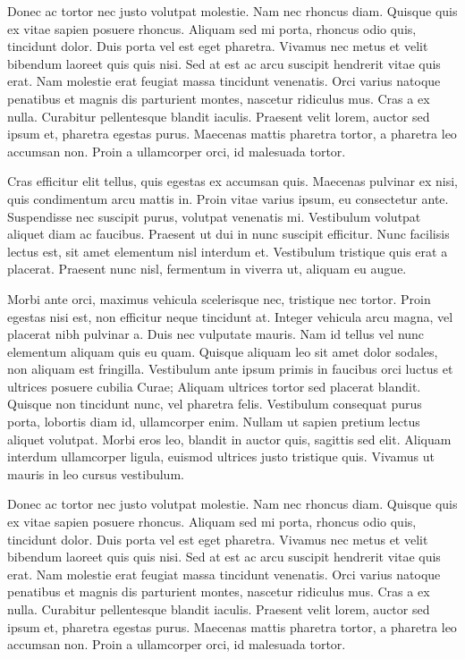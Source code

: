 \documentclass[OGEO,XML,SOM,NoBabelFrench,Unicode,twocolumn,review]{cedram}
\begin{document}
        Donec ac tortor nec justo volutpat molestie. Nam nec rhoncus diam. Quisque quis ex vitae sapien posuere rhoncus. Aliquam sed mi porta, rhoncus odio quis, tincidunt dolor. Duis porta vel est eget pharetra. Vivamus nec metus et velit bibendum laoreet quis quis nisi. Sed at est ac arcu suscipit hendrerit vitae quis erat. Nam molestie erat feugiat massa tincidunt venenatis. Orci varius natoque penatibus et magnis dis parturient montes, nascetur ridiculus mus. Cras a ex nulla. Curabitur pellentesque blandit iaculis. Praesent velit lorem, auctor sed ipsum et, pharetra egestas purus. Maecenas mattis pharetra tortor, a pharetra leo accumsan non. Proin a ullamcorper orci, id malesuada tortor.
        
        Cras efficitur elit tellus, quis egestas ex accumsan quis. Maecenas pulvinar ex nisi, quis condimentum arcu mattis in. Proin vitae varius ipsum, eu consectetur ante. Suspendisse nec suscipit purus, volutpat venenatis mi. Vestibulum volutpat aliquet diam ac faucibus. Praesent ut dui in nunc suscipit efficitur. Nunc facilisis lectus est, sit amet elementum nisl interdum et. Vestibulum tristique quis erat a placerat. Praesent nunc nisl, fermentum in viverra ut, aliquam eu augue.
    
        Morbi ante orci, maximus vehicula scelerisque nec, tristique nec tortor. Proin egestas nisi est, non efficitur neque tincidunt at. Integer vehicula arcu magna, vel placerat nibh pulvinar a. Duis nec vulputate mauris. Nam id tellus vel nunc elementum aliquam quis eu quam. Quisque aliquam leo sit amet dolor sodales, non aliquam est fringilla. Vestibulum ante ipsum primis in faucibus orci luctus et ultrices posuere cubilia Curae; Aliquam ultrices tortor sed placerat blandit. Quisque non tincidunt nunc, vel pharetra felis. Vestibulum consequat purus porta, lobortis diam id, ullamcorper enim. Nullam ut sapien pretium lectus aliquet volutpat. Morbi eros leo, blandit in auctor quis, sagittis sed elit. Aliquam interdum ullamcorper ligula, euismod ultrices justo tristique quis. Vivamus ut mauris in leo cursus vestibulum.
        
        Donec ac tortor nec justo volutpat molestie. Nam nec rhoncus diam. Quisque quis ex vitae sapien posuere rhoncus. Aliquam sed mi porta, rhoncus odio quis, tincidunt dolor. Duis porta vel est eget pharetra. Vivamus nec metus et velit bibendum laoreet quis quis nisi. Sed at est ac arcu suscipit hendrerit vitae quis erat. Nam molestie erat feugiat massa tincidunt venenatis. Orci varius natoque penatibus et magnis dis parturient montes, nascetur ridiculus mus. Cras a ex nulla. Curabitur pellentesque blandit iaculis. Praesent velit lorem, auctor sed ipsum et, pharetra egestas purus. Maecenas mattis pharetra tortor, a pharetra leo accumsan non. Proin a ullamcorper orci, id malesuada tortor.
\end{document}
